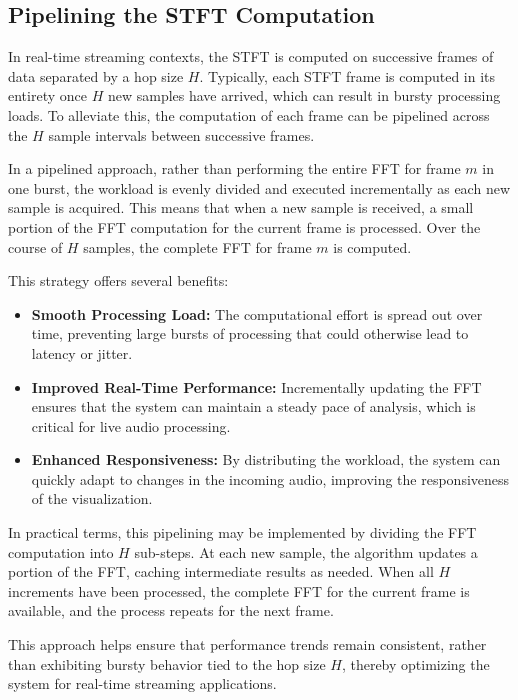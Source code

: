 \documentclass[12pt,letter]{article}
\begin{document}
\subsection{Pipelining the STFT Computation}

In real-time streaming contexts, the STFT is computed on successive frames of
data separated by a hop size \( H \). Typically, each STFT frame is computed
in its entirety once \( H \) new samples have arrived, which can result in
bursty processing loads. To alleviate this, the computation of each frame can
be pipelined across the \( H \) sample intervals between successive frames.

In a pipelined approach, rather than performing the entire FFT for frame
\( m \) in one burst, the workload is evenly divided and executed
incrementally as each new sample is acquired. This means that when a new
sample is received, a small portion of the FFT computation for the current
frame is processed. Over the course of \( H \) samples, the complete FFT for
frame \( m \) is computed.

This strategy offers several benefits:
\begin{itemize}
  \item \textbf{Smooth Processing Load:} The computational effort is spread
  out over time, preventing large bursts of processing that could otherwise
  lead to latency or jitter.
  \item \textbf{Improved Real-Time Performance:} Incrementally updating the
  FFT ensures that the system can maintain a steady pace of analysis, which
  is critical for live audio processing.
  \item \textbf{Enhanced Responsiveness:} By distributing the workload, the
  system can quickly adapt to changes in the incoming audio, improving the
  responsiveness of the visualization.
\end{itemize}

In practical terms, this pipelining may be implemented by dividing the FFT
computation into \( H \) sub-steps. At each new sample, the algorithm updates
a portion of the FFT, caching intermediate results as needed. When all
\( H \) increments have been processed, the complete FFT for the current
frame is available, and the process repeats for the next frame.

This approach helps ensure that performance trends remain consistent, rather
than exhibiting bursty behavior tied to the hop size \( H \), thereby
optimizing the system for real-time streaming applications.


\clearpage
\finalPage
\end{document}
